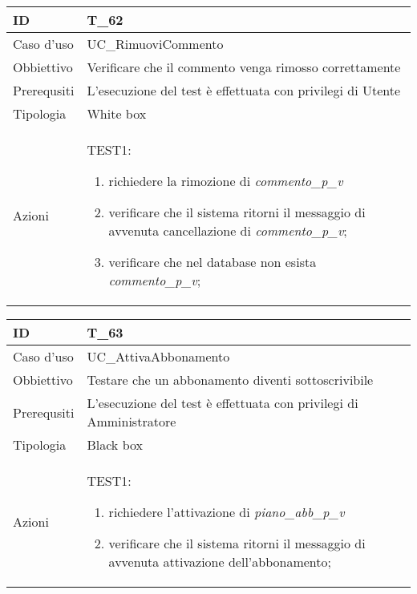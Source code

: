 \begin{table}[hb]
    \centering
    \begin{tabular}{ |p{2cm}|p{10cm}|  }
        \hline
        ID          & T\_62                                                      \\\hline
        Caso d'uso  & UC\_RimuoviCommento                                        \\\hline
        Obbiettivo  & Verificare che il commento venga rimosso correttamente     \\\hline
        Prerequsiti & L'esecuzione del test è effettuata con privilegi di Utente \\\hline
        Tipologia   & White box                                                  \\\hline
        Azioni      &
        TEST1:
        \begin{enumerate}[nosep, topsep=0pt]
            \item richiedere la rimozione di \emph{commento\_p\_v}
            \item verificare che il sistema ritorni il messaggio di avvenuta cancellazione di \emph{commento\_p\_v};
            \item verificare che nel database non esista \emph{commento\_p\_v};
        \end{enumerate}
        \\\hline
    \end{tabular}
\end{table}


\begin{table}[hb]
    \centering
    \begin{tabular}{ |p{2cm}|p{10cm}|  }
        \hline
        ID          & T\_63                                                              \\\hline
        Caso d'uso  & UC\_AttivaAbbonamento                                              \\\hline
        Obbiettivo  & Testare che un abbonamento diventi sottoscrivibile                 \\\hline
        Prerequsiti & L'esecuzione del test è effettuata con privilegi di Amministratore \\\hline
        Tipologia   & Black box                                                          \\\hline
        Azioni      &
        TEST1:
        \begin{enumerate}[nosep, topsep=0pt]
            \item richiedere l'attivazione di \emph{piano\_abb\_p\_v}
            \item verificare che il sistema ritorni il messaggio di avvenuta attivazione dell'abbonamento;
        \end{enumerate}
        \\\hline
    \end{tabular}
\end{table}